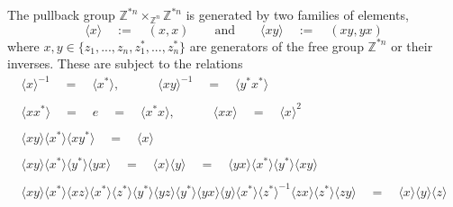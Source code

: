 \documentclass{amsbook} %
\numberwithin{section}{chapter}
\begin{document}
\begin{prop} \label{pushpres} The pullback group $\mathbb{Z}^{\ast n} \times_{\mathbb{Z}^n} \mathbb{Z}^{\ast n}$ is generated by two families of elements,
\[ \langle x \rangle \quad := \quad (x, x) \quad \quad \text{and} \quad \quad \langle xy \rangle \quad := \quad (xy, yx) \]
where $x,y \in \{z_1, ..., z_n, z_1^*, ..., z_n^*\}$ are generators of the free group $\mathbb{Z}^{\ast n}$ or their inverses. These are subject to the relations
\[ \begin{array}{c}
			\langle x \rangle^{-1} \quad = \quad \langle x^* \rangle, \quad \quad \quad \langle xy \rangle^{-1} \quad = \quad \langle y^*x^* \rangle \\
			\\
			\langle xx^* \rangle \quad = \quad e \quad = \quad \langle x^*x \rangle, \quad \quad \quad \langle xx \rangle \quad = \quad \langle x \rangle^2 \\
			\\
			\langle xy \rangle \langle x^* \rangle \langle xy^* \rangle \quad = \quad \langle x \rangle \\
			\\
			\langle xy \rangle \langle x^* \rangle \langle y^* \rangle \langle yx \rangle \quad = \quad \langle x \rangle \langle y \rangle  \quad = \quad \langle yx \rangle \langle x^* \rangle \langle y^* \rangle \langle xy \rangle \\
			\\
			\langle xy \rangle \langle x^* \rangle \langle xz \rangle \langle x^* \rangle \langle z^* \rangle \langle y^* \rangle \langle yz \rangle \langle y^* \rangle \langle yx \rangle \langle y \rangle \langle x^* \rangle \langle z^* \rangle^{-1} \langle zx \rangle \langle z^* \rangle \langle zy \rangle \quad = \quad \langle x \rangle\langle y \rangle\langle z \rangle 
		\end{array}
\]
\end{prop}
\end{document}
